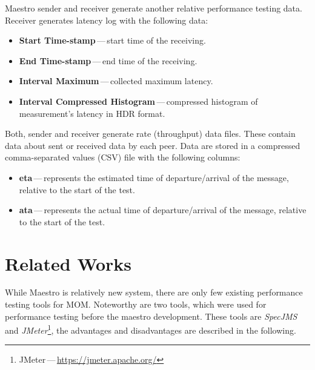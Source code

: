 Maestro sender and receiver generate another relative performance testing data. Receiver generates latency log with the following data:

\begin{itemize}
	\setlength\itemsep{0em}
	\item \textbf{Start Time-stamp}\,---\,start time of the receiving.
	\item \textbf{End Time-stamp}\,---\,end time of the receiving.
	\item \textbf{Interval Maximum}\,---\,collected maximum latency.
	\item \textbf{Interval Compressed Histogram}\,---\,compressed histogram of measurement's latency in HDR\footnotemark{} format.
\end{itemize}

Both, sender and receiver generate rate (throughput) data files. These contain data about sent or received data by each peer. Data are stored in a compressed comma-separated values (CSV) file with the following columns:

\begin{itemize}
	\setlength\itemsep{0em}
	\item \textbf{eta}\,---\,represents the estimated time of departure/arrival of the message, relative to the start of the test.
	\item \textbf{ata}\,---\,represents the actual time of departure/arrival of the message, relative to the start of the test.
\end{itemize}


\section{Related Works}
\label{Related Works}

While Maestro is relatively new system, there are only few existing performance testing tools for MOM. Noteworthy are two tools, which were used for performance testing before the maestro development. These tools are \emph{SpecJMS} \cite{SPECJMS} and \emph{JMeter}\footnote{JMeter\,---\,\url{https://jmeter.apache.org/}}, the advantages and disadvantages are described in the following.

